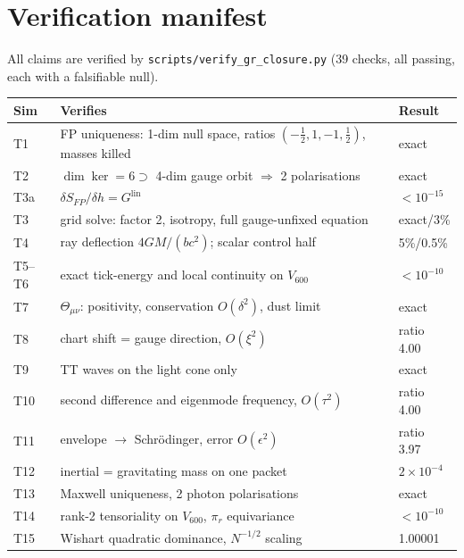 \documentclass[12pt]{article}
\theoremstyle{definition}
\theoremstyle{remark}
\newcommand{\Th}{\Theta}
\begin{document}
\section{Verification manifest}\label{sec:manifest}

All claims are verified by \texttt{scripts/verify\_gr\_closure.py} (39 checks, all passing, each with a falsifiable null).

\begin{center}
\begin{tabular}{lll}
\toprule
Sim & Verifies & Result \\
\midrule
T1 & FP uniqueness: 1-dim null space, ratios $(-\tfrac12,1,-1,\tfrac12)$, masses killed & exact \\
T2 & $\dim\ker = 6 \supset$ 4-dim gauge orbit $\Rightarrow$ 2 polarisations & exact \\
T3a & $\delta S_{FP}/\delta h = G^{\mathrm{lin}}$ & $<10^{-15}$ \\
T3 & grid solve: factor 2, isotropy, full gauge-unfixed equation & exact/3\% \\
T4 & ray deflection $4GM/(bc^2)$; scalar control half & 5\%/0.5\% \\
T5--T6 & exact tick-energy and local continuity on $V_{600}$ & $<10^{-10}$ \\
T7 & $\Th_{\mu\nu}$: positivity, conservation $O(\delta^2)$, dust limit & exact \\
T8 & chart shift = gauge direction, $O(\xi^2)$ & ratio 4.00 \\
T9 & TT waves on the light cone only & exact \\
T10 & second difference and eigenmode frequency, $O(\tau^2)$ & ratio 4.00 \\
T11 & envelope $\to$ Schr\"odinger, error $O(\epsilon^2)$ & ratio 3.97 \\
T12 & inertial = gravitating mass on one packet & $2\times10^{-4}$ \\
T13 & Maxwell uniqueness, 2 photon polarisations & exact \\
T14 & rank-2 tensoriality on $V_{600}$, $\pi_r$ equivariance & $<10^{-10}$ \\
T15 & Wishart quadratic dominance, $N^{-1/2}$ scaling & 1.00001 \\
\bottomrule
\end{tabular}
\end{center}
\end{document}
